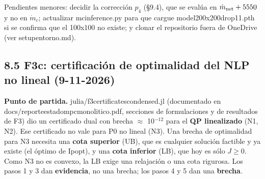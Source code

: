 \documentclass[11pt,a4paper]{article}
\newcommand{\codeus}{\textunderscore\allowbreak}
\newcommand{\code}[1]{{\small\ttfamily\let\_\codeus #1}}
\begin{document}
Pendientes menores: decidir la corrección $p_4$ (\S{}9.4), que se evalúa en $\dot m_{\rm net}+5550$ y no en $\dot m_c$; actualizar \code{mc\_inference.py} para que cargue \code{model\_200x200\_drop1\_1.pth} si se confirma que el 100x100 no existe; y clonar el repositorio fuera de OneDrive (ver \code{setup\_entorno.md}).

\subsection*{8.5 F3c: certificación de optimalidad del NLP no lineal (9-11-2026)}
\textbf{Punto de partida.} \code{julia/f3\_certificates\_condensed.jl} (documentado en \code{docs/reporte\_estado\_mpc\_monolitico.pdf}, secciones de formulaciones y de resultados de F3) dio un certificado dual con brecha $\approx$ 10$^{-12}$ para el \textbf{QP linealizado} (N1, N2). Ese certificado no vale para P0 no lineal (N3). Una brecha de optimalidad para N3 necesita una \textbf{cota superior} (UB), que es cualquier solución factible y ya existe (el óptimo de Ipopt), y una \textbf{cota inferior} (LB), que hoy es sólo $J\ge0$. Como N3 no es convexo, la LB exige una relajación o una cota rigurosa. Los pasos 1 y 3 dan \textbf{evidencia}, no una brecha; los pasos 4 y 5 dan una \textbf{brecha}.
\end{document}
